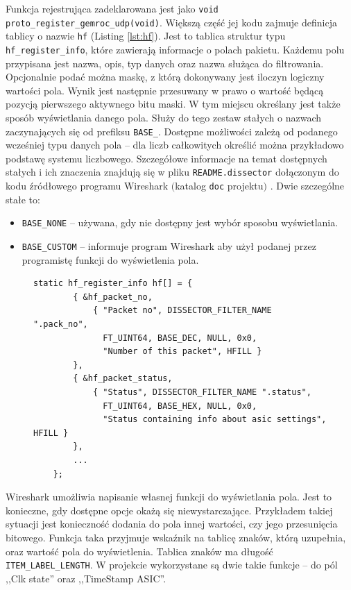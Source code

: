 \documentclass[a4paper, 11pt, twoside, openright]{article}
\begin{document}
	\indent\par
	Funkcja rejestrująca zadeklarowana jest jako \texttt{void proto\_register\_gemroc\_udp(void)}. Większą część jej kodu zajmuje definicja tablicy
	o nazwie \texttt{hf} (Listing \ref{lst:hf}). Jest to tablica struktur typu \texttt{hf\_register\_info}, które zawierają informacje o polach pakietu. Każdemu polu przypisana
	jest nazwa, opis, typ danych oraz nazwa służąca do filtrowania. Opcjonalnie podać można maskę, z którą dokonywany jest iloczyn logiczny
	wartości pola. Wynik jest następnie przesuwany w prawo o wartość będącą pozycją pierwszego aktywnego bitu maski.
	W tym miejscu określany jest także sposób wyświetlania danego pola. Służy do tego zestaw stałych o nazwach
	zaczynających się od prefiksu \texttt{BASE\_}. Dostępne możliwości zależą od podanego wcześniej typu danych pola -- dla liczb całkowitych
	określić można przykładowo podstawę systemu liczbowego. Szczegółowe informacje na temat dostępnych stałych i ich znaczenia
	znajdują się w pliku \texttt{README.dissector} dołączonym do kodu źródłowego programu Wireshark $($katalog \texttt{doc} projektu$)$ \cite{README.dissector}.
	Dwie szczególne stałe to:
	\begin{itemize}
		\item \texttt{BASE\_NONE} -- używana, gdy nie dostępny jest wybór sposobu wyświetlania.
		\item \texttt{BASE\_CUSTOM} -- informuje program Wireshark aby użył podanej przez programistę funkcji do wyświetlenia pola.
	\end{itemize}

	\begin{figure}[ht]

		\begin{lstlisting}[style=CStyle,caption={Deklaracja tablicy \texttt{hf}},label={lst:hf}]
	static hf_register_info hf[] = {
		{ &hf_packet_no,
			{ "Packet no", DISSECTOR_FILTER_NAME ".pack_no",
			  FT_UINT64, BASE_DEC, NULL, 0x0,
			  "Number of this packet", HFILL }
		},
		{ &hf_packet_status,
			{ "Status", DISSECTOR_FILTER_NAME ".status",
			  FT_UINT64, BASE_HEX, NULL, 0x0,
			  "Status containing info about asic settings", HFILL }
		},
		...
	}; \end{lstlisting}

	\end{figure}

	Wireshark umożliwia napisanie własnej funkcji do wyświetlania pola. Jest to konieczne, gdy dostępne opcje okażą się niewystarczające.
	Przykładem takiej sytuacji jest konieczność dodania do pola innej wartości, czy jego przesunięcia bitowego.
	Funkcja taka przyjmuje wskaźnik na tablicę znaków, którą uzupełnia, oraz wartość pola do wyświetlenia. Tablica znaków ma długość
	\texttt{ITEM\_LABEL\_LENGTH}. W projekcie wykorzystane są dwie takie funkcje -- do pól ,,Clk state'' oraz ,,TimeStamp ASIC''.
\end{document}
